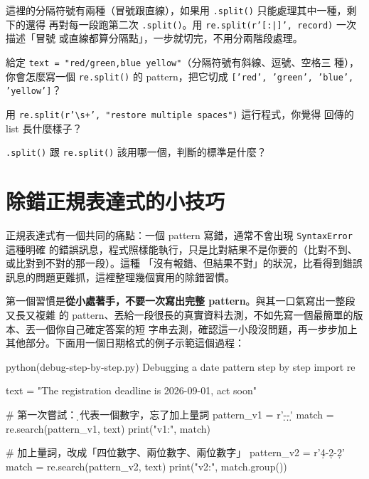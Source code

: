 這裡的分隔符號有兩種（冒號跟直線），如果用 \texttt{.split()} 只能處理其中一種，剩下的還得
再對每一段跑第二次 \texttt{.split()}。用 \texttt{re.split(r'[:|]', record)} 一次描述「冒號
或直線都算分隔點」，一步就切完，不用分兩階段處理。

\begin{drills}[label=drills:regex-split]
\item 給定 \texttt{text = "red/green,blue   yellow"}（分隔符號有斜線、逗號、空格三
種），你會怎麼寫一個 \texttt{re.split()} 的 pattern，把它切成
\texttt{['red', 'green', 'blue', 'yellow']}？
\item 用 \texttt{re.split(r'\textbackslash s+', "restore   multiple    spaces")} 這行程式，你覺得
回傳的 list 長什麼樣子？
\item \texttt{.split()} 跟 \texttt{re.split()} 該用哪一個，判斷的標準是什麼？
\end{drills}

\section{除錯正規表達式的小技巧}
\label{sec:regex-debug}

正規表達式有一個共同的痛點：一個 pattern 寫錯，通常不會出現 \texttt{SyntaxError} 這種明確
的錯誤訊息，程式照樣能執行，只是比對結果不是你要的（比對不到、或比對到不對的那一段）。這種
「沒有報錯、但結果不對」的狀況，比看得到錯誤訊息的問題更難抓，這裡整理幾個實用的除錯習慣。

第一個習慣是\textbf{從小處著手，不要一次寫出完整 pattern}。與其一口氣寫出一整段又長又複雜
的 pattern、丟給一段很長的真實資料去測，不如先寫一個最簡單的版本、丟一個你自己確定答案的短
字串去測，確認這一小段沒問題，再一步步加上其他部分。下面用一個日期格式的例子示範這個過程：

\begin{example}{python}{(debug-step-by-step.py) Debugging a date pattern step by step}
import re

text = "The registration deadline is 2026-09-01, act soon"

# 第一次嘗試：\d 只代表一個數字，忘了加上量詞
pattern_v1 = r'\d-\d-\d'
match = re.search(pattern_v1, text)
print("v1:", match)

# 加上量詞，改成「四位數字、兩位數字、兩位數字」
pattern_v2 = r'\d{4}-\d{2}-\d{2}'
match = re.search(pattern_v2, text)
print("v2:", match.group())
\end{example}


